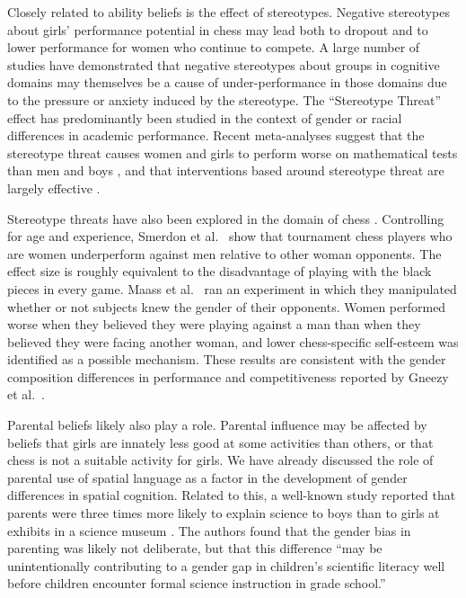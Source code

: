 \documentclass[9pt,twocolumn,twoside,lineno]{pnas-new}
\begin{document}
Closely related to ability beliefs is the effect of stereotypes. Negative stereotypes about girls' performance potential in chess may lead both to dropout and to lower performance for women who continue to compete. A large number of studies have demonstrated that negative stereotypes about groups in cognitive domains may themselves be a cause of under-performance in those domains due to the pressure or anxiety induced by the stereotype. The ``Stereotype Threat'' effect has predominantly been studied in the context of gender or racial differences in academic performance. Recent meta-analyses suggest that the stereotype threat causes women and girls to perform worse on mathematical tests than men and boys \cite{picho2013}, and that interventions based around stereotype threat are largely effective \cite{liu2020}.

Stereotype threats have also been explored in the domain of chess \cite{de2022micro, backus2023gender}. Controlling for age and experience, Smerdon et al.~\cite{smerdon2020female} show that tournament chess players who are women underperform against men relative to other woman opponents. The effect size is roughly equivalent to the disadvantage of playing with the black pieces in every game. Maass et al.~\citep{maass2008} ran an experiment in which they manipulated whether or not subjects knew the gender of their opponents. Women performed worse when they believed they were playing against a man than when they believed they were facing another woman, and lower chess-specific self-esteem was identified as a possible mechanism. These results are consistent with the gender composition differences in performance and competitiveness reported by Gneezy et al.~\cite{gneezy2003}.

Parental beliefs likely also play a role. Parental influence may be affected by beliefs that girls are innately less good at some activities than others, or that chess is not a suitable activity for girls. We have already discussed the role of parental use of spatial language as a factor in the development of gender differences in spatial cognition. Related to this, a well-known study reported that parents were three times more likely to explain science to boys than to girls at exhibits in a science museum \cite{crowley2001}. The authors found that the gender bias in parenting was likely not deliberate, but that this difference ``may be unintentionally contributing to a gender gap in children's scientific literacy well before children encounter formal science instruction in grade school.'' 
\end{document}
